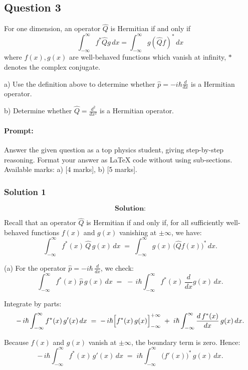\documentclass{article}
\begin{document}
\subsection{Question 3} 

For one dimension, an operator $\hat{Q}$ is Hermitian if and only if
\[
\int_{-\infty}^{\infty} f^* \hat{Q} g \, dx = \int_{-\infty}^{\infty} g (\hat{Q} f)^* \, dx
\]
where $f(x), g(x)$ are well-behaved functions which vanish at infinity, $*$ denotes the complex conjugate.

a) Use the definition above to determine whether $\hat{p} = -i\hbar \frac{d}{dx}$ is a Hermitian operator.

b) Determine whether $\hat{Q} = \frac{d^2}{dx^2}$ is a Hermitian operator.

\paragraph{Prompt: \\} 
Answer the given question as a top physics student, giving step-by-step reasoning. Format your answer as LaTeX code without using sub-sections. Available marks: a) [4 marks], b) [5 marks].

\subsubsection{Solution 1}

\[
\textbf{Solution:}
\]

Recall that an operator \(\hat{Q}\) is Hermitian if and only if, for all sufficiently well-behaved functions \(f(x)\) and \(g(x)\) vanishing at \(\pm\infty\), we have:
\[
\int_{-\infty}^{\infty} f^*(x)\,\hat{Q}\,g(x)\,dx 
\;=\; 
\int_{-\infty}^{\infty} g(x)\,\bigl(\hat{Q}f(x)\bigr)^*\,dx.
\]

(a) For the operator \(\hat{p} = -i\hbar\,\frac{d}{dx}\), we check:
\[
\int_{-\infty}^{\infty} f^*(x)\,\hat{p}\,g(x)\,dx 
\;=\;
-\,i\hbar \int_{-\infty}^{\infty} f^*(x)\,\frac{d}{dx}g(x)\,dx.
\]

Integrate by parts:
\[
-\,i\hbar \int_{-\infty}^{\infty} f^*(x)\,g'(x)\,dx
\;=\;
-\,i\hbar
\Bigl[
f^*(x)\,g(x)\Bigr]_{-\infty}^{+\infty}
\;+\;
i\hbar \int_{-\infty}^{\infty} \frac{d\,f^*(x)}{dx}\,g(x)\,dx.
\]

Because \(f(x)\) and \(g(x)\) vanish at \(\pm\infty\), the boundary term is zero. Hence:
\[
-\,i\hbar \int_{-\infty}^{\infty} f^*(x)\,g'(x)\,dx
\;=\;
i\hbar \int_{-\infty}^{\infty} \bigl(f'(x)\bigr)^*\,g(x)\,dx.
\]
\end{document}

